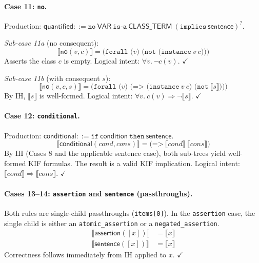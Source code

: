 \paragraph{Case 11: \texttt{no}.}
Production: $\mathsf{quantified} ::= \texttt{no}\ \mathsf{VAR}\ \texttt{is-a}\ \mathsf{CLASS\_TERM}\ (\texttt{implies}\ \mathsf{sentence})^{?}$.

\textit{Sub-case 11a} (no consequent):
\begin{equation*}
  \llbracket \mathsf{no}(v, c) \rrbracket
    = \texttt{(forall (}v\texttt{) (not (instance}\ v\ c\texttt{)))}
\end{equation*}
Asserts the class $c$ is empty.
Logical intent: $\forall v.\ \lnot c(v)$. \hfill$\checkmark$

\textit{Sub-case 11b} (with consequent $s$):
\begin{equation*}
  \llbracket \mathsf{no}(v, c, s) \rrbracket
    = \texttt{(forall (}v\texttt{) (=>\ (instance}\ v\ c\texttt{) (not}\ \llbracket s \rrbracket\texttt{)))}
\end{equation*}
By IH, $\llbracket s \rrbracket$ is well-formed.
Logical intent: $\forall v.\ c(v) \Rightarrow \lnot\llbracket s \rrbracket$. \hfill$\checkmark$

\paragraph{Case 12: \texttt{conditional}.}
Production: $\mathsf{conditional} ::= \texttt{if}\ \mathsf{condition}\ \texttt{then}\ \mathsf{sentence}$.
\begin{equation*}
  \llbracket \mathsf{conditional}(\mathit{cond}, \mathit{cons}) \rrbracket
    = \texttt{(=>}\ \llbracket \mathit{cond} \rrbracket\ \llbracket \mathit{cons} \rrbracket\texttt{)}
\end{equation*}
By IH (Cases 8 and the applicable sentence case), both sub-trees yield well-formed
KIF formulas. The result is a valid KIF implication.
Logical intent: $\llbracket \mathit{cond} \rrbracket \Rightarrow \llbracket \mathit{cons} \rrbracket$. \hfill$\checkmark$

\paragraph{Cases 13--14: \texttt{assertion} and \texttt{sentence} (passthroughs).}
Both rules are single-child passthroughs (\texttt{items[0]}). In the
\texttt{assertion} case, the single child is either an \texttt{atomic\_assertion}
or a \texttt{negated\_assertion}.
\begin{align*}
  \llbracket \mathsf{assertion}([x]) \rrbracket &= \llbracket x \rrbracket \\
  \llbracket \mathsf{sentence}([x]) \rrbracket  &= \llbracket x \rrbracket
\end{align*}
Correctness follows immediately from IH applied to $x$. \hfill$\checkmark$

